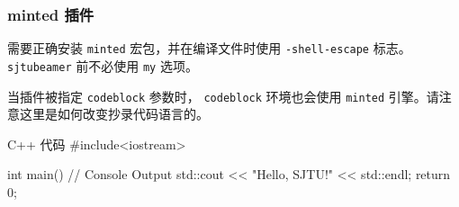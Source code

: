 \documentclass{ctexbeamer}
\begin{document}
\begin{frame}[fragile]  %
  \frametitle{minted 插件}
  需要正确安装 \texttt{minted} 宏包，并在编译文件时使用 \texttt{-shell-escape} 标志。\texttt{sjtubeamer} 前不必使用 \texttt{my} 选项。
\end{frame}
\begin{frame}[fragile]
  当插件被指定 \texttt{codeblock} 参数时，
  \texttt{codeblock} 环境也会使用 \texttt{minted} 引擎。请注意这里是如何改变抄录代码语言的。
\end{frame}
\begin{frame}[fragile]  %
  \renewcommand{\mintedlanguage}{cpp} %
  \begin{codeblock}[]{C++ 代码}
    #include<iostream>

    int main(){
        // Console Output
        std::cout << "Hello, SJTU!" << std::endl;
        return 0;
      }       \end{codeblock}
\end{frame}
\end{document}
